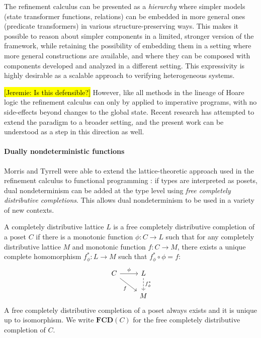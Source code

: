 \documentclass[sigplan,screen]{acmart}
\newcommand{\hlc}[2][yellow]{ {\sethlcolor{#1} \hl{#2}} }
\newcommand\jk[1]{\hlc[pink]{[Jeremie: #1]}}
\begin{document}
The refinement calculus can be presented as a \emph{hierarchy}
where simpler models (state transformer functions, relations)
can be embedded in more general ones (predicate transformers)
in various structure-preserving ways.
This makes it possible to reason about simpler components
in a limited, stronger version of the framework,
while retaining the possibility of embedding them
in a setting
where more general constructions are available,
and where they can be composed with components
developed and analyzed in a different setting.
This expressivity is highly desirable
as a scalable approach to
verifying heterogeneous systems.

\jk{Is this defensible?}
However,
like all methods in the lineage of Hoare logic
the refinement calculus can only by applied to imperative programs,
with no side-effects beyond changes to the global state.
Recent research has attempted to extend the paradigm
to a broader setting,
and the present work can be understood
as a step in this direction as well.


\paragraph{Dually nondeterministic functions} %

Morris and Tyrrell were able to extend
the lattice-theoretic approach used in the refinement calculus
to functional programming
\cite{augtyp,dndf,cspdnd}:
if types are interpreted as posets,
dual nondeterminism can be added at the type level
using \emph{free completely distributive completions}.
This allows dual nondeterminism to be used
in a variety of new contexts.

A completely distributive lattice $L$ is a
free completely distributive completion of
a poset $C$ if there is
a monotonic function $\phi : C \rightarrow L$
such that
for any completely distributive lattice $M$
and monotonic function $f : C \rightarrow M$,
there exists a unique complete homomorphism $f^*_\phi : L \rightarrow M$
such that $f^*_\phi \circ \phi = f$:
\[
  \begin{tikzcd}%
    C \arrow[r, "\phi"] \arrow[rd, "f"'] &
    L \arrow[d, "f^*_\phi", dashed] \\ & M
  \end{tikzcd}
\]
A free completely distributive completion of a poset
always exists and it is unique up to isomorphism.
We write $\mathbf{FCD}(C)$ for
the free completely distributive completion of $C$.
\end{document}
